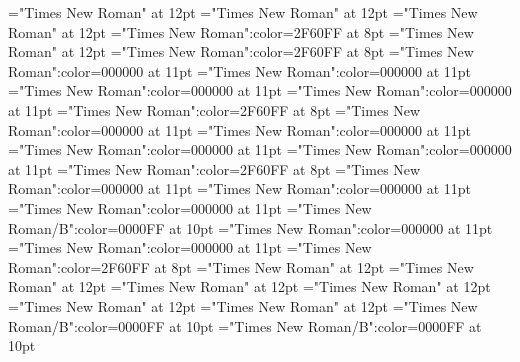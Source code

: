 \documentclass[a4paper]{article}
\begin{document}
\font\partofspeechptgrammaticalinfosensesensesentrybletDatadicBody="Times New Roman" at 12pt
\font{}="Times New Roman" at 12pt
\font\xitemptdefinitionLcptsensesensesentrybletDatadicBody="Times New Roman" at 12pt
\font\xlanguagetagenxitemptdefinitionLcptsensesensesentrybletDatadicBody="Times New Roman":color=2F60FF at 8pt
\font\xitemendefinitionLcptsensesensesentrybletDatadicBody="Times New Roman" at 12pt
\font\xlanguagetagenxitemendefinitionLcptsensesensesentrybletDatadicBody="Times New Roman":color=2F60FF at 8pt
\font\relationssensesensesentryletDatadicBody="Times New Roman":color=000000 at 11pt
\font\lexreftargetsrelationssensesensesentryletDatadicBody="Times New Roman":color=000000 at 11pt
\font\sensecrossrefsehlexreftargetsrelationssensesensesentryletDatadicBody="Times New Roman":color=000000 at 11pt
\font{}="Times New Roman":color=000000 at 11pt
\font\xlanguagetagendefinitionptsensesensesentryletDatadicBody="Times New Roman":color=2F60FF at 8pt
\font\examplessensesensesentryletDatadicBody="Times New Roman":color=000000 at 11pt
\font\examplesehexamplessensesensesentryletDatadicBody="Times New Roman":color=000000 at 11pt
\font\translationsexamplessensesensesentryletDatadicBody="Times New Roman":color=000000 at 11pt
\font\translationpttranslationsexamplessensesensesentryletDatadicBody="Times New Roman":color=000000 at 11pt
\font\xlanguagetagentranslationpttranslationsexamplessensesensesentryletDatadicBody="Times New Roman":color=2F60FF at 8pt
\font\xitemrelationssensesensesentryletDatadicBody="Times New Roman":color=000000 at 11pt
\font\lexreftargetsxitemrelationssensesensesentryletDatadicBody="Times New Roman":color=000000 at 11pt
\font\sensecrossrefsehlexreftargetsxitemrelationssensesensesentryletDatadicBody="Times New Roman":color=000000 at 11pt
\font\xhomographnumberptheadwordsehentryletDatadicBody="Times New Roman/B":color=0000FF at 10pt
\font\xsensenumberLcensensesensesentryletDatadicBody="Times New Roman":color=000000 at 11pt
\font{}="Times New Roman":color=000000 at 11pt
\font\xlanguagetagendefinitionLcensensesensesentryletDatadicBody="Times New Roman":color=2F60FF at 8pt
\font\entrycletDatadicBody="Times New Roman" at 12pt
\font\pictureRightNoneentrycletDatadicBody="Times New Roman" at 12pt
\font\picturepictureRightNoneentrycletDatadicBody="Times New Roman" at 12pt
\font\pictureCaptionpictureRightNoneentrycletDatadicBody="Times New Roman" at 12pt
\font\CmPicturepublishStemCaptionSenseNumberpictureCaptionpictureRightNoneentrycletDatadicBody="Times New Roman" at 12pt
\font\CmPicturepublishStemCaptionCaptionPubptpictureCaptionpictureRightNoneentrycletDatadicBody="Times New Roman" at 12pt
\font\headwordsehentrycletDatadicBody="Times New Roman/B":color=0000FF at 10pt
\font\headwordafterentrycletDatadicBody="Times New Roman/B":color=0000FF at 10pt
\end{document}
